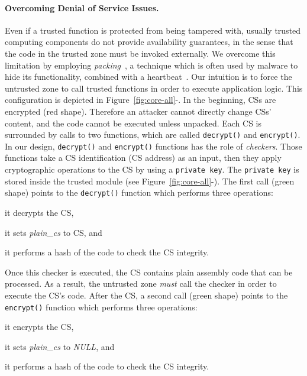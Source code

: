 \paragraph{Overcoming Denial of Service Issues.}
Even if a trusted function is protected from being tampered with, usually 
trusted computing components do not provide availability guarantees, in the 
sense that the code in the trusted zone must be invoked externally.
We overcome this limitation by employing 
\emph{packing}~\citep{ugarte2016rambo}, 
a technique which is often used by malware to hide its functionality, combined 
with a heartbeat~\citep{ghosh2010secure}. %
Our intuition is to force the untrusted zone to call trusted functions in order 
to execute application logic.
This configuration is depicted in Figure~\ref{fig:core-all}-.
In the beginning, CSs are encrypted (red shape). Therefore an attacker cannot 
directly change CSs' content, and the code cannot be executed unless unpacked.
Each CS is surrounded by calls to two functions, which are called 
\texttt{decrypt()} and \texttt{encrypt()}.
In our design, \texttt{decrypt()} and \texttt{encrypt()} functions has the role 
of \emph{checkers}.
Those functions take a CS identification (\eg CS address) as an input, then 
they apply cryptographic operations to the CS by using a \texttt{private key}. 
The \texttt{private key} is stored inside the trusted module (see 
Figure~\ref{fig:core-all}-).
The first call (green shape) points to
the \texttt{decrypt()} function which performs three operations:
\begin{enumerate*}[label=(\roman*)]
	\item it decrypts the CS,
	\item it sets \emph{plain\_cs} to CS, and
	\item it performs a hash of the code to check the CS integrity.
\end{enumerate*}
Once this checker is executed, the CS contains plain assembly code that can be 
processed.
As a result, the untrusted zone \emph{must} call the checker in order to 
execute the CS's code.
After the CS, a second call (green shape) points to the \texttt{encrypt()} 
function which performs three operations:
\begin{enumerate*}[label=(\roman*)]
	\item it encrypts the CS,
	\item it sets \emph{plain\_cs} to \emph{NULL}, and
	\item it performs a hash of the code to check the CS integrity.
\end{enumerate*}
